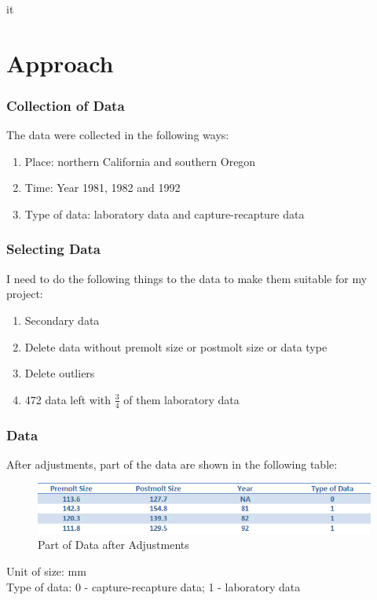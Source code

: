 it\documentclass[compress,handout,10pt]{beamer}
\let\olditem\item
\renewcommand{\item}{\setlength{\itemsep}{0.5\baselineskip}\olditem}
\begin{document}
\section{Approach}
\begin{frame}
    \frametitle{Collection of Data}
    The data were collected in the following ways:
     \begin{enumerate}
         \item Place: northern California and southern Oregon
         \item Time: Year 1981, 1982 and 1992
         \item Type of data: laboratory data and capture-recapture data
     \end{enumerate}
\end{frame}

\begin{frame}
    \frametitle{Selecting Data}
    I need to do the following things to the data to make them suitable for my project:
     \begin{enumerate}
         \item Secondary data
         \item Delete data without premolt size or postmolt size or data type
         \item Delete outliers
         \item 472 data left with $\frac{3}{4}$ of them laboratory data
     \end{enumerate}
\end{frame}

\begin{frame}
    \frametitle{Data}
    After adjustments, part of the data are shown in the following table:
    \begin{figure}
        \begin{center}
	    \includegraphics[width=\textwidth]{data.png}
	\end{center}
	\caption{Part of Data after Adjustments}
    \end{figure}
    Unit of size: mm\\
    Type of data: 0 - capture-recapture data; 1 - laboratory data
\end{frame}
\end{document}
